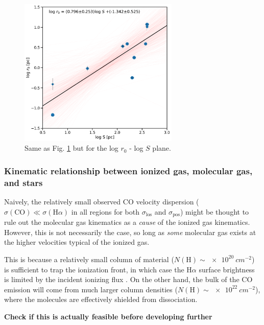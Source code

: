 \documentclass[fleqn,usenatbib, useAMS, a4paper]{mnras}
\newcommand\pos{\ensuremath{_{\mathrm{pos}}}}
\newcommand\los{\ensuremath{_{\mathrm{los}}}}
\newcommand\ha{\ensuremath{\text{H}\alpha}}
\newcommand*\chem[1]{\ensuremath{\mathrm{#1}}}
\begin{document}
\begin{figure}
\centering 
\includegraphics[width=3in]{Figures/corr-rvsS}
\caption{Same as Fig. \ref{fig:rvsR} but for the log \(r_0\) - log \(S\) plane. }
\label{fig:rvsR}
\end{figure}


\subsubsection{Kinematic relationship between ionized gas, molecular gas, and stars}
\label{sec:kinem-rela-betw}

Naively, the relatively small observed CO velocity dispersion
(\(\sigma(\chem{CO}) \ll \sigma(\ha)\) in all regions
for both \(\sigma\los\) and \(\sigma\pos\))
might be thought to rule out the molecular gas kinematics
as a \emph{cause} of the ionized gas kinematics.
However, this is not necessarily the case, so long as \emph{some} molecular gas
exists at the higher velocities typical of the ionized gas.

This is because a relatively small column of material
(\(N(\chem{H}) \sim \SI{e20}{cm^{-2}}\))
is sufficient to trap the ionization front,
in which case the \ha{} surface brightness is limited by the
incident ionizing flux
\citetext{the Ferland mechanism,
  see section~5.1 of \citealt{Baldwin:1991a}
  and section~B.2.1 of \citealt{Ferland:2012a}
}.
On the other hand, the bulk of the CO emission will come from much larger
column densities (\(N(\chem{H}) \sim \SI{e22}{cm^{-2}}\)),
where the molecules are effectively shielded from dissociation.

\textbf{Check  if this is actually feasible before developing further}
\end{document}
